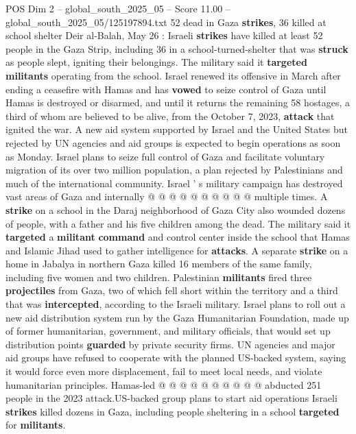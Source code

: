 \begin{textsample}{POS Dim 2 – global\_south\_2025\_05 – Score 11.00 – global\_south\_2025\_05/125197894.txt}  \label{ex:f2_pos_300}
52 dead in Gaza \textbf{strikes}, 36 killed at school shelter Deir al-Balah, May 26 : Israeli \textbf{strikes} have killed at least 52 people in the Gaza Strip, including 36 in a school-turned-shelter that was \textbf{struck} as people slept, igniting their belongings.
The military said it \textbf{targeted} \textbf{militants} operating from the school.
Israel renewed its offensive in March after ending a ceasefire with Hamas and has \textbf{vowed} to seize control of Gaza until Hamas is destroyed or disarmed, and until it returns the remaining 58 hostages, a third of whom are believed to be alive, from the October 7, 2023, \textbf{attack} that ignited the war.
A new aid system supported by Israel and the United States but rejected by UN agencies and aid groups is expected to begin operations as soon as Monday.
Israel plans to seize full control of Gaza and facilitate voluntary migration of its over two million population, a plan rejected by Palestinians and much of the international community.
Israel ' s military campaign has destroyed vast areas of Gaza and internally @ @ @ @ @ @ @ @ @ @ multiple times.
A \textbf{strike} on a school in the Daraj neighborhood of Gaza City also wounded dozens of people, with a father and his five children among the dead.
The military said it \textbf{targeted} a \textbf{militant} \textbf{command} and control center inside the school that Hamas and Islamic Jihad used to gather intelligence for \textbf{attacks}.
A separate \textbf{strike} on a home in Jabalya in northern Gaza killed 16 members of the same family, including five women and two children.
Palestinian \textbf{militants} fired three \textbf{projectiles} from Gaza, two of which fell short within the territory and a third that was \textbf{intercepted}, according to the Israeli military.
Israel plans to roll out a new aid distribution system run by the Gaza Humanitarian Foundation, made up of former humanitarian, government, and military officials, that would set up distribution points \textbf{guarded} by private security firms.
UN agencies and major aid groups have refused to cooperate with the planned US-backed system, saying it would force even more displacement, fail to meet local needs, and violate humanitarian principles.
Hamas-led @ @ @ @ @ @ @ @ @ @ abducted 251 people in the 2023 attack.US-backed group plans to start aid operations Israeli \textbf{strikes} killed dozens in Gaza, including people sheltering in a school \textbf{targeted} for \textbf{militants}.

\end{textsample}
